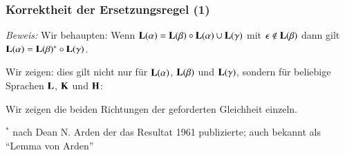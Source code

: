 \documentclass[onlymath]{beamer}
\begin{document}
\begin{frame}\frametitle{Korrektheit der Ersetzungsregel (1)}


\emph{Beweis:} Wir behaupten: Wenn $\textbf{\textcolor{black}{L}}(\alpha)= \textbf{\textcolor{black}{L}}(\beta)\circ \textbf{\textcolor{black}{L}}(\alpha)\cup\textbf{\textcolor{black}{L}}(\gamma)$ mit $\epsilon\notin\textbf{\textcolor{black}{L}}(\beta)$ dann gilt $\textbf{\textcolor{black}{L}}(\alpha)=\textbf{\textcolor{black}{L}}(\beta)^*\circ\textbf{\textcolor{black}{L}}(\gamma)$.
\bigskip

Wir zeigen: dies gilt nicht nur für $\textbf{\textcolor{black}{L}}(\alpha)$, $\textbf{\textcolor{black}{L}}(\beta)$ und $\textbf{\textcolor{black}{L}}(\gamma)$, sondern für beliebige Sprachen $\textbf{\textcolor{black}{L}}$, $\textbf{\textcolor{black}{K}}$ und $\textbf{\textcolor{black}{H}}$:
\bigskip

\bigskip

Wir zeigen die beiden Richtungen der geforderten Gleichheit einzeln.
\bigskip

{\tiny \alert{${}^*$ nach Dean N. Arden der das Resultat 1961 publizierte; auch bekannt als "`Lemma von Arden"'}}


\end{frame}
\end{document}
